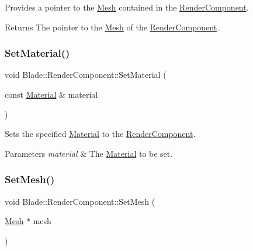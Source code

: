 Provides a pointer to the \hyperlink{class_blade_1_1_mesh}{Mesh} contained in the \hyperlink{class_blade_1_1_render_component}{Render\+Component}. 

\begin{DoxyReturn}{Returns}
The pointer to the \hyperlink{class_blade_1_1_mesh}{Mesh} of the \hyperlink{class_blade_1_1_render_component}{Render\+Component}. 
\end{DoxyReturn}
\mbox{\label{class_blade_1_1_render_component_ae985d0c5ac2ff9eb158683e72203ddf1}} 
\subsubsection{\texorpdfstring{Set\+Material()}{SetMaterial()}}
{\footnotesize\ttfamily void Blade\+::\+Render\+Component\+::\+Set\+Material (\begin{DoxyParamCaption}\item[{const \hyperlink{struct_blade_1_1_material}{Material} \&}]{material }\end{DoxyParamCaption})\hspace{0.3cm}{\ttfamily [noexcept]}}



Sets the specified \hyperlink{struct_blade_1_1_material}{Material} to the \hyperlink{class_blade_1_1_render_component}{Render\+Component}. 


\begin{DoxyParams}{Parameters}
{\em material} & The \hyperlink{struct_blade_1_1_material}{Material} to be set. \\
\hline
\end{DoxyParams}
\mbox{\label{class_blade_1_1_render_component_a23d49cb161e26089cc246c9fb5f739a8}} 
\subsubsection{\texorpdfstring{Set\+Mesh()}{SetMesh()}}
{\footnotesize\ttfamily void Blade\+::\+Render\+Component\+::\+Set\+Mesh (\begin{DoxyParamCaption}\item[{\hyperlink{class_blade_1_1_mesh}{Mesh} $\ast$}]{mesh }\end{DoxyParamCaption})\hspace{0.3cm}{\ttfamily [noexcept]}}




